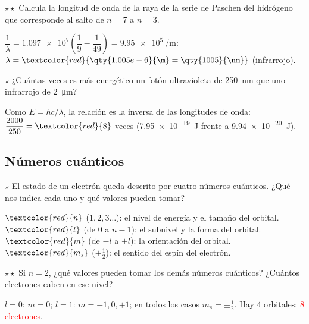 \begin{exercise}
    \(\star\star\) Calcula la longitud de onda de la raya de la serie de Paschen del hidrógeno que corresponde al salto de
    \(n = 7\) a \(n = 3\).
    \begin{solu}
        \(\dfrac{1}{\lambda} = \num{1.097e7} \left( \dfrac{1}{9} - \dfrac{1}{49} \right) = \qty{9.95e5}{\per\m}\):
        \(\lambda = \textcolor{red}{\qty{1.005e-6}{\m} = \qty{1005}{\nm}}\) (infrarrojo).
    \end{solu}
\end{exercise}

\begin{exercise}
    \(\star\) ¿Cuántas veces es más energético un fotón ultravioleta de \qty{250}{\nm} que uno infrarrojo de \qty{2}{\micro\m}?
    \begin{solu}
        Como \(E = hc/\lambda\), la relación es la inversa de las longitudes de onda: \(\dfrac{2000}{250} = \textcolor{red}{8}\)
        veces (\qty{7.95e-19}{\joule} frente a \qty{9.94e-20}{\joule}).
    \end{solu}
\end{exercise}

\subsection{Números cuánticos}

\begin{exercise}
    \(\star\) El estado de un electrón queda descrito por cuatro números cuánticos. ¿Qué nos indica cada uno y qué valores pueden
    tomar?
    \begin{solu}
        \(\textcolor{red}{n}\) (\(1, 2, 3\dots\)): el nivel de energía y el tamaño del orbital. \(\textcolor{red}{l}\) (de 0 a
        \(n-1\)): el subnivel y la forma del orbital. \(\textcolor{red}{m}\) (de \(-l\) a \(+l\)): la orientación del orbital.
        \(\textcolor{red}{m_s}\) (\(\pm\frac{1}{2}\)): el sentido del espín del electrón.
    \end{solu}
\end{exercise}

\begin{exercise}
    \(\star\star\) Si \(n = 2\), ¿qué valores pueden tomar los demás números cuánticos? ¿Cuántos electrones caben en ese nivel?
    \begin{solu}
        \(l = 0\): \(m = 0\); \(l = 1\): \(m = -1, 0, +1\); en todos los casos \(m_s = \pm\frac{1}{2}\). Hay 4 orbitales:
        \textcolor{red}{8 electrones}.
    \end{solu}
\end{exercise}

